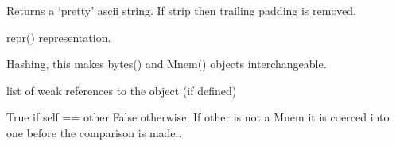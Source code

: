 \documentclass[letterpaper,10pt,english]{sphinxmanual}
\begin{document}
\begin{fulllineitems}
\begin{fulllineitems}
\label{\detokenize{ref/LIS/core/Mnem:TotalDepth.LIS.core.Mnem.Mnem.pStr}}
Returns a ‘pretty’ ascii string. If strip then trailing padding is removed.

\end{fulllineitems}


\begin{fulllineitems}
\label{\detokenize{ref/LIS/core/Mnem:TotalDepth.LIS.core.Mnem.Mnem.__repr__}}
repr() representation.

\end{fulllineitems}


\begin{fulllineitems}
\label{\detokenize{ref/LIS/core/Mnem:TotalDepth.LIS.core.Mnem.Mnem.__hash__}}
Hashing, this makes bytes() and Mnem() objects interchangeable.

\end{fulllineitems}


\begin{fulllineitems}
\label{\detokenize{ref/LIS/core/Mnem:TotalDepth.LIS.core.Mnem.Mnem.__weakref__}}
list of weak references to the object (if defined)

\end{fulllineitems}


\begin{fulllineitems}
\label{\detokenize{ref/LIS/core/Mnem:TotalDepth.LIS.core.Mnem.Mnem.__eq__}}
True if self == other False otherwise.
If other is not a Mnem it is coerced into one before the comparison is made..

\end{fulllineitems}



\end{fulllineitems}
\end{document}
